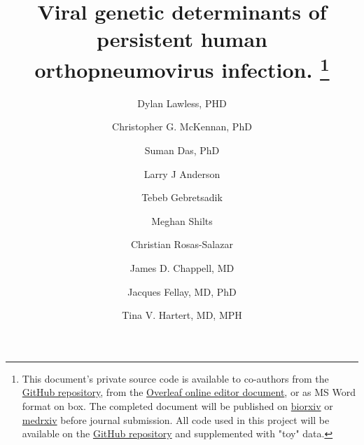 \documentclass{article}
\begin{document}
\date{} %
\title{\Large \bf Viral genetic determinants of persistent human orthopneumovirus infection.
\footnote{This document's private source code is available to co-authors from the 
\href{https://github.com/DylanLawless/inspire_manscript}{GitHub repository}, from the 
\href{https://www.overleaf.com/project/61718a4e077acc3d20ee68f1}{Overleaf online editor document}, or as MS Word format on box. The completed document will be published on 
\href{https://www.biorxiv.org}{biorxiv} or \href{https://www.medrxiv.org}{medrxiv} before journal submission.
All code used in this project will be available on the 
\href{https://github.com/DylanLawless/inspire_manscript}{GitHub repository} and supplemented with "toy" data.}
}

\author[1]{\rm Dylan Lawless, PHD}
\author[2]{\rm Christopher G. McKennan, PhD}
\author[]{\rm Suman Das, PhD}
\author[]{\rm Larry J Anderson}
\author[]{\rm  Tebeb Gebretsadik}
\author[]{\rm Meghan Shilts}
\author[]{\rm Christian Rosas-Salazar}
\author[3]{\rm James D. Chappell, MD}
\author[1]{\rm Jacques Fellay, MD, PhD }
\author[3,4]{\rm Tina V. Hartert, MD, MPH}




\maketitle

\end{document}
